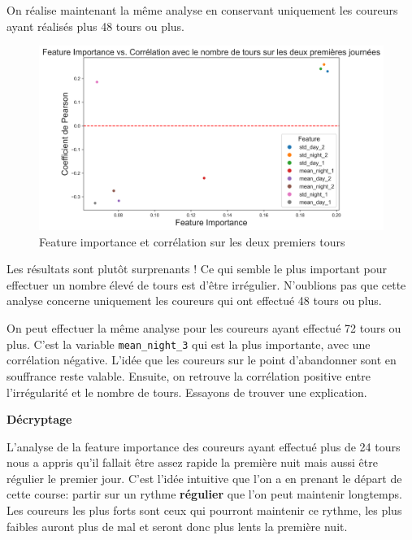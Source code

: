 \documentclass[a4paper,12pt]{article}
\begin{document}
On réalise maintenant la même analyse en conservant uniquement les coureurs ayant réalisés plus 48 tours ou plus.
\begin{figure}[!h]
	
	\includegraphics[scale=0.41	]{feature2}
	\centering
	\caption{Feature importance et corrélation sur les deux premiers tours}
\end{figure}

\medskip

Les résultats sont plutôt surprenants ! Ce qui semble le plus important pour effectuer un nombre élevé de tours est d'être irrégulier. N'oublions pas que cette analyse concerne uniquement les coureurs qui ont effectué 48 tours ou plus. 

\medskip

On peut effectuer la même analyse pour les coureurs ayant effectué 72 tours ou plus. C'est la variable \texttt{mean\_night\_3} qui est la plus importante, avec une corrélation négative. L'idée que les coureurs sur le point d'abandonner sont en souffrance reste valable. Ensuite, on retrouve la corrélation positive entre l'irrégularité et le nombre de tours. Essayons de trouver une explication. 

\begin{center}
	\textbf{Décryptage}
\end{center}
L'analyse de la feature importance des coureurs ayant effectué plus de 24 tours nous a appris qu'il fallait être assez rapide la première nuit mais aussi être régulier le premier jour. C'est l'idée intuitive que l'on a en prenant le départ de cette course: partir sur un rythme \textbf{régulier} que l'on peut maintenir longtemps. Les coureurs les plus forts sont ceux qui pourront maintenir ce rythme, les plus faibles auront plus de mal et seront donc plus lents la première nuit.

\medskip
\end{document}
